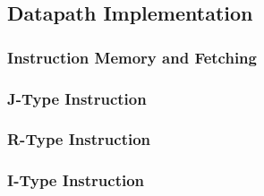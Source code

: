 \documentclass{beamer}
\begin{document}











\subsection{Datapath Implementation}

\begin{frame}%
\frametitle{Instruction Memory and Fetching}

\end{frame}

\begin{frame}%
\frametitle{J-Type Instruction}

\end{frame}

\begin{frame}%
\frametitle{R-Type Instruction}

\end{frame}

\begin{frame}%
\frametitle{I-Type Instruction}

\end{frame}
\end{document}
